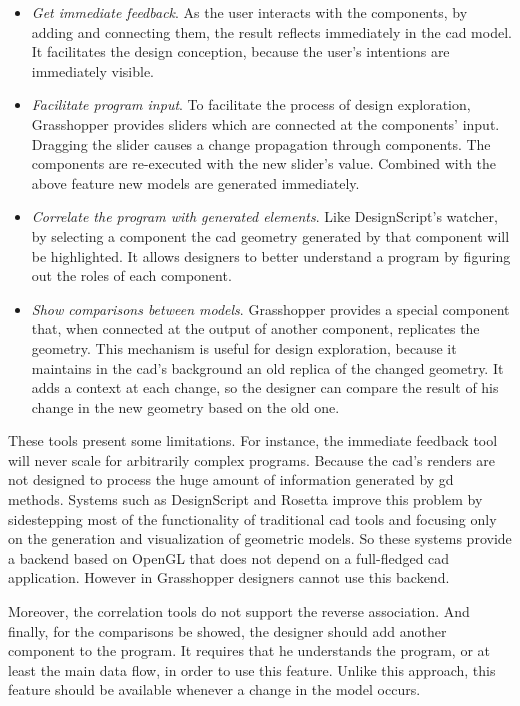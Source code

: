 \begin{itemize}
 \item \textit{Get immediate feedback}. As the user interacts with the components, by adding and connecting them, the result reflects immediately in the \ac{cad} model. It facilitates the design conception, because the user's intentions are immediately visible. 
 \item \textit{Facilitate program input}. To facilitate the process of design exploration, Grasshopper provides sliders which are connected at the components' input. Dragging the slider causes a change propagation through components. The components are re-executed with the new slider's value. Combined with the above feature new models are generated immediately.
 \item \textit{Correlate the program with generated elements}. Like DesignScript's watcher, by selecting a component the \ac{cad} geometry generated by that component will be highlighted. It allows designers to better understand a program by figuring out the roles of each component.
 \item \textit{Show comparisons between models}. Grasshopper provides a special component that, when connected at the output of another component, replicates the geometry. This mechanism is useful for design exploration, because it maintains in the \ac{cad}'s background an old replica of the changed geometry. It adds a context at each change, so the designer can compare the result of his change in the new geometry based on the old one.
\end{itemize}

These tools present some limitations. For instance, the immediate feedback tool will never scale for arbitrarily complex programs. Because the \ac{cad}'s renders are not designed to process the huge amount of information generated by \ac{gd} methods. Systems such as DesignScript and Rosetta improve this problem by sidestepping most of the functionality of traditional \ac{cad} tools and focusing only on the generation and visualization of geometric models. So these systems provide a backend based on OpenGL that does not depend on a full-fledged \ac{cad} application. However in Grasshopper designers cannot use this backend.

Moreover, the correlation tools do not support the reverse association. And finally, for the comparisons be showed, the designer should add another component to the program. It requires that he understands the program, or at least the main data flow, in order to use this feature. Unlike this approach, this feature should be available whenever a change in the model occurs.
